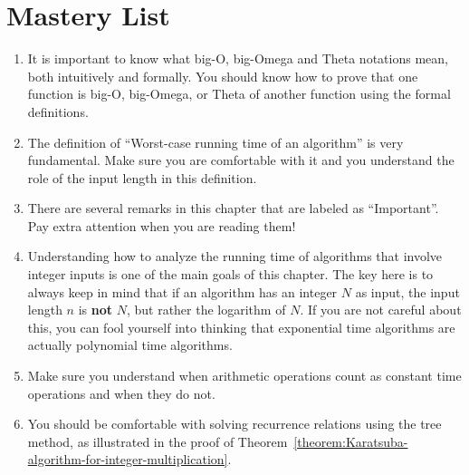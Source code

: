 \section{Mastery List}

\begin{enumerate}
    \item It is important to know what big-O, big-Omega and Theta notations mean, both intuitively and formally. You should know how to prove that one function is big-O, big-Omega, or Theta of another function using the formal definitions.
    \item The definition of ``Worst-case running time of an algorithm'' is very fundamental. Make sure you are comfortable with it and you understand the role of the input length in this definition. 
    \item There are several remarks in this chapter that are labeled as ``Important''. Pay extra attention when you are reading them!
    \item Understanding how to analyze the running time of algorithms that involve integer inputs is one of the main goals of this chapter. The key here is to always keep in mind that if an algorithm has an integer $N$ as input, the input length $n$ is \textbf{not} $N$, but rather the logarithm of $N$. If you are not careful about this, you can fool yourself into thinking that exponential time algorithms are actually polynomial time algorithms.
    \item Make sure you understand when arithmetic operations count as constant time operations and when they do not.
    \item You should be comfortable with solving recurrence relations using the tree method, as illustrated in the proof of Theorem~\ref{theorem:Karatsuba-algorithm-for-integer-multiplication}.
\end{enumerate}


